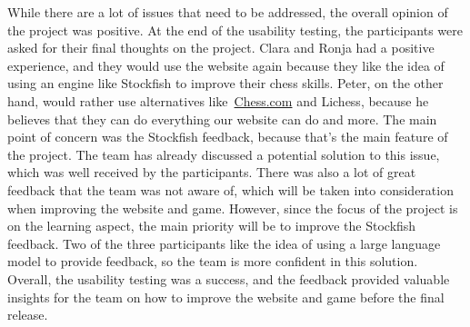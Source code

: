 While there are a lot of issues that need to be addressed, the overall opinion of the project was positive.
At the end of the usability testing, the participants were asked for their final thoughts on the project.
Clara and Ronja had a positive experience, and they would use the website again because they like the idea of using an
engine like Stockfish to improve their chess skills.
Peter, on the other hand, would rather use alternatives like~\url{Chess.com} and Lichess, because he believes that they
can do everything our website can do and more.
The main point of concern was the Stockfish feedback, because that's the main feature of the project.
The team has already discussed a potential solution to this issue, which was well received by the participants.
There was also a lot of great feedback that the team was not aware of, which will be taken into consideration when
improving the website and game.
However, since the focus of the project is on the learning aspect, the main priority will be to improve the Stockfish
feedback.
Two of the three participants like the idea of using a large language model to provide feedback, so the team is more
confident in this solution.
Overall, the usability testing was a success, and the feedback provided valuable insights for the team on how to improve
the website and game before the final release.
